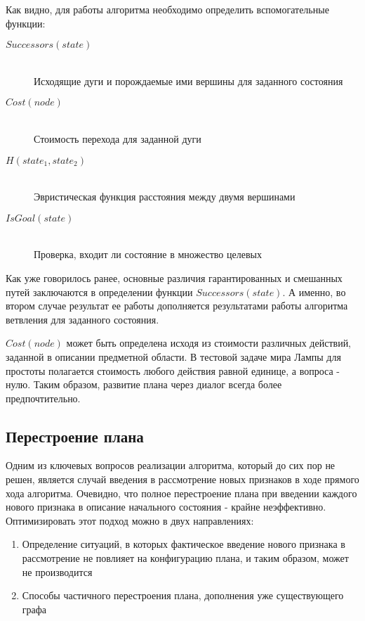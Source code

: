 Как видно, для работы алгоритма необходимо определить вспомогательные функции:
\begin{description}
 \item[$Successors(state)$] \hfill \\
 Исходящие дуги и порождаемые ими вершины для заданного состояния
 \item[$Cost(node)$] \hfill \\
 Стоимость перехода для заданной дуги
 \item[$H(state_1, state_2)$] \hfill \\
 Эвристическая функция расстояния между двумя вершинами
 \item[$IsGoal(state)$] \hfill \\
 Проверка, входит ли состояние в множество целевых
\end{description}

Как уже говорилось ранее, основные различия гарантированных и смешанных путей заключаются в определении функции $Successors(state)$. А именно, во втором случае результат ее работы дополняется результатами работы алгоритма ветвления для заданного состояния.

$Cost(node)$ может быть определена исходя из стоимости различных действий, заданной в описании предметной области. В тестовой задаче мира Лампы для простоты полагается стоимость любого действия равной единице, а вопроса - нулю. Таким образом, развитие плана через диалог всегда более предпочтительно.

\subsection{Перестроение плана}

Одним из ключевых вопросов реализации алгоритма, который до сих пор не решен, является случай введения в рассмотрение новых признаков в ходе прямого хода алгоритма. Очевидно, что полное перестроение плана при введении каждого нового признака в описание начального состояния - крайне неэффективно. Оптимизировать этот подход можно в двух направлениях:

\begin{enumerate}
 \item Определение ситуаций, в которых фактическое введение нового признака в рассмотрение не повлияет на конфигурацию плана, и таким образом, может не производится
 \item Способы частичного перестроения плана, дополнения уже существующего графа
\end{enumerate}


